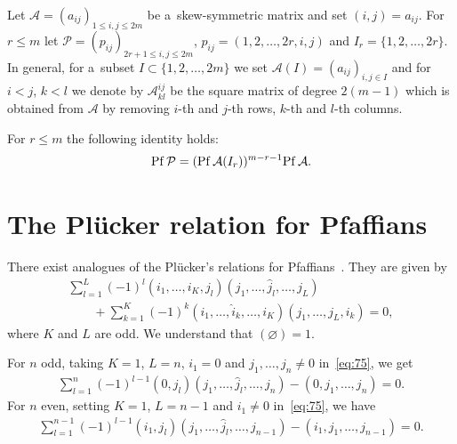   Let ${\mathcal A}=(a_{ij})_{1\le i,j\le2m}$ be a~skew-symmetric matrix and set $(i,j)=a_{ij}$.
For $r\le m$ let ${\mathcal P} =(p_{ij})_{2r+1\le i,j\le2m}$, $p_{ij}=(1,2,\dots,2r,i,j)$ and $I_r=\{1,2,\dots,2r\}$.
In general, for a~subset $I\subset\{1,2,\dots,2m\}$ we set ${\mathcal A}(I)=(a_{ij})_{i,j\in I}$ and for $i<j$, $k<l$
we denote by ${\mathcal A}_{kl}^{ij}$ be the square matrix of degree $2(m-1)$ which is obtained from ${\mathcal A}$ by
removing $i$-th and $j$-th rows, $k$-th and $l$-th columns.

\begin{theorem}[\cite{H2}]\label{theorem5} For $r\le m$ the following identity holds:
\begin{gather*}%
{\rm Pf}\,{\mathcal P}=({\rm Pf}\,{\mathcal A}(I_r))^{m-r-1}{\rm Pf}\,{\mathcal A}.
\end{gather*}
\end{theorem}

\section{The Pl\"{u}cker relation for Pfaf\/f\/ians}\label{appendixC}

 There exist analogues of the Pl\"{u}cker's
relations for Pfaf\/f\/ians~\cite{O1}.
They are given by
\begin{gather}
\sum_{l=1}^L(-1)^l(i_1,\dots,i_K,j_l)(j_1,\dots,\hat{j}_l,\dots,j_L)
\nonumber
\\
\qquad
{}+\sum_{k=1}
^K(-1)^k(i_1,\dots,\hat{i}_k,\dots,i_K)(j_1,\dots,j_L,i_k)=0,
\label{eq:75}
\end{gather}
where $K$ and $L$ are odd.
We understand that $(\varnothing)=1$.

For $n$ odd, taking $K=1$, $L=n$, $i_1=0$ and $j_1,\dots,j_n\neq0$ in~\eqref{eq:75}, we get
\begin{gather}
\sum_{l=1}^n(-1)^{l-1}(0,j_l)(j_1,\dots,\hat{j}_l,\dots,j_n)-(0,j_1,\dots,j_n)=0.
\label{eq:500}
\end{gather}
For $n$ even, setting $K=1$, $L=n-1$ and $i_1\neq0$ in~\eqref{eq:75}, we have
\begin{gather}
\sum_{l=1}^{n-1}(-1)^{l-1}(i_1,j_l)(j_1,\dots,\hat{j}_l,\dots,j_{n-1})-(i_1,j_1,\dots,j_{n-1})=0.
\label{eq:501}
\end{gather}
